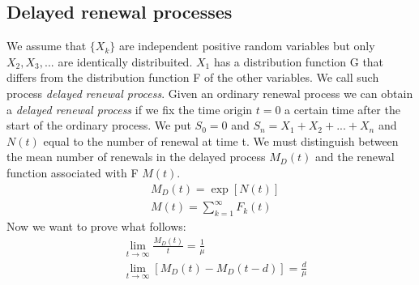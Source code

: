 \subsection{Delayed renewal processes}

We assume that $\{X_k\}$ are independent positive random variables but only $X_2,X_3,...$ are identically distribuited. $X_1$ has a distribution function G that differs from the distribution function F of the other variables. We call such process \textit{delayed renewal process}. Given an ordinary renewal process we can obtain a \textit{delayed renewal process} if we fix the time origin $t=0$ a certain time after the start of the ordinary process. We put $S_0=0$ and $S_n=X_1+X_2+...+X_n$ and $N(t)$ equal to the number of renewal at time t. We must distinguish between the mean number of renewals in the delayed process $M_D(t)$ and the renewal function associated with F $M(t)$.
\begin{align}
	& M_D(t) = \exp[N(t)]
	\\ & M(t) = \sum_{k=1}^{\infty}F_k(t)
\end{align}
Now we want to prove what follows:
\begin{align*}
	& \lim_{t \to \infty }\frac{M_D(t)}{t}=\frac{1}{\mu}
	\\ & \lim_{t \to \infty }[M_D(t)-M_D(t-d)]=\frac{d}{\mu}
\end{align*}

